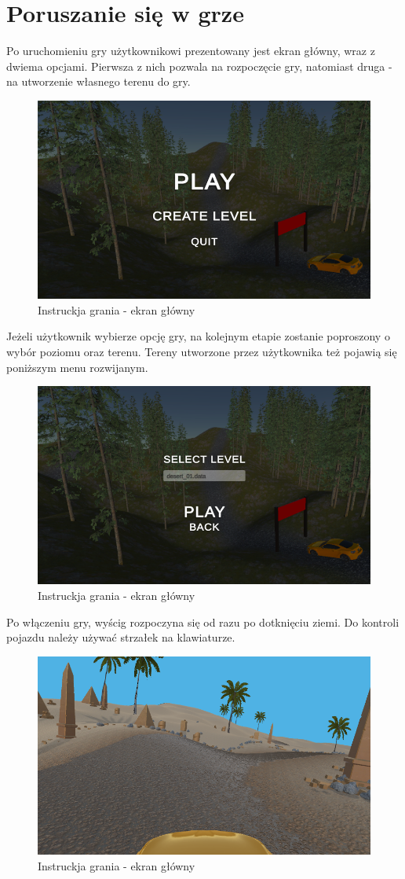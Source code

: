 \section{Poruszanie się w grze}
    Po uruchomieniu gry użytkownikowi prezentowany jest ekran główny, wraz z dwiema opcjami. Pierwsza z nich pozwala na rozpoczęcie gry, 
    natomiast druga - na utworzenie własnego terenu do gry.
    \begin{figure}[H]
        \centering
        \includegraphics[width=.7\textwidth]{figures/game_instruction_start.png}
        \caption{Instruckja grania - ekran główny}
        \label{fig}
    \end{figure}
    Jeżeli użytkownik wybierze opcję gry, na kolejnym etapie zostanie poproszony o wybór poziomu oraz terenu. 
    Tereny utworzone przez użytkownika też pojawią się poniższym menu rozwijanym.
    \begin{figure}[H]
        \centering
        \includegraphics[width=.7\textwidth]{figures/game_instruction_choose_level.png}
        \caption{Instruckja grania - ekran główny}
        \label{fig}
    \end{figure}
    \clearpage
    Po włączeniu gry, wyścig rozpoczyna się od razu po dotknięciu ziemi. Do kontroli pojazdu należy używać strzałek na klawiaturze.
    \begin{figure}[H]
        \centering
        \includegraphics[width=.7\textwidth]{figures/game_instruction_play.png}
        \caption{Instruckja grania - ekran główny}
        \label{fig}
    \end{figure}
